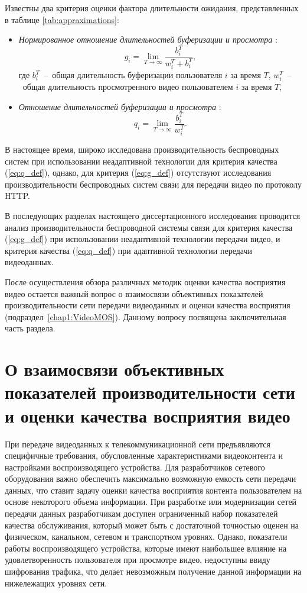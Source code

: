 Известны два критерия оценки фактора длительности ожидания, представленных в таблице \ref{tab:appraximations}:
\begin{itemize}
	\item \textit{Нормированное отношение длительностей буферизации и просмотра} \cite{QoE_Ozgur,past_tur}:
	\begin{equation}
    	\label{eq:g_def}
    	g_i = \lim\limits_{T\rightarrow\infty} \frac{b_i^T}{w_i^T + b_i^T},
    \end{equation}
    где $b_i^T$~--~общая длительность буферизации пользователя $i$ за время $T$, $w_i^T$~--~общая длительность просмотренного видео пользователем $i$ за время $T$,
	\item \textit{Отношение длительностей буферизации и просмотра} \cite{Bakin_Globecom}:
	\begin{equation}
    	\label{eq:q_def}
    	q_i = \lim\limits_{T\rightarrow\infty} \frac{b_i^T}{w_i^T}.
    \end{equation}
\end{itemize}
В настоящее время, широко исследована производительность беспроводных систем при использовании неадаптивной технологии для критерия качества (\ref{eq:q_def}), однако, для критерия (\ref{eq:g_def}) отсутствуют исследования производительности беспроводных систем связи для передачи видео по протоколу HTTP.

В последующих разделах настоящего диссертационного исследования проводится анализ производительности беспроводной системы связи для критерия качества (\ref{eq:g_def}) при использовании неадаптивной технологии передачи видео, и критерия качества (\ref{eq:q_def}) при адаптивной технологии передачи видеоданных.

После осуществления обзора различных методик оценки качества восприятия видео остается важный вопрос о взаимосвязи объективных показателей производительности сети передачи видеоданных и оценки качества восприятия (подраздел~\ref{chap1:VideoMOS}). Данному вопросу посвящена заключительная часть раздела.

\section{О взаимосвязи объективных показателей производительности сети и оценки качества восприятия видео}
\label{chap1:InterrelationKPIandQoE}

При передаче видеоданных к телекоммуникационной сети предъявляются специфичные требования, обусловленные характеристиками видеоконтента и настройками воспроизводящего устройства. Для разработчиков сетевого оборудования важно обеспечить максимально возможную емкость сети передачи данных, что ставит задачу оценки качества восприятия контента пользователем на основе некоторого объема информации. При разработке или модернизации сетей передачи данных разработчикам доступен ограниченный набор показателей качества обслуживания, который может быть с достаточной точностью оценен на физическом, канальном, сетевом и транспортном уровнях. Однако, показатели работы воспроизводящего устройства, которые имеют наибольшее влияние на удовлетворенность пользователя при просмотре видео, недоступны ввиду шифрования трафика, что делает невозможным получение данной информации на нижележащих уровнях сети.

